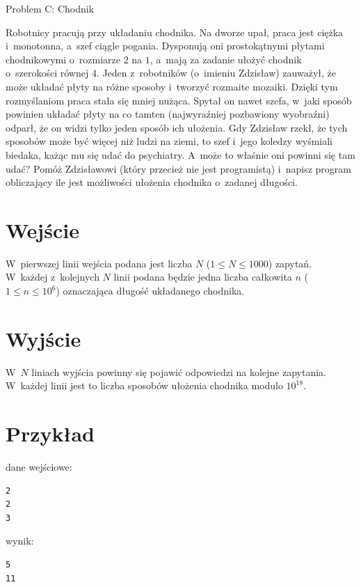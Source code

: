 \documentclass{article}
\begin{document}
\begin{center}
  \begin{Huge}
    Problem C: Chodnik
  \end{Huge}
\end{center}

Robotnicy pracują przy układaniu chodnika. Na dworze upał, praca jest ciężka i~monotonna, a~szef
ciągle pogania. Dysponują oni prostokątnymi płytami chodnikowymi o~rozmiarze $2$ na $1$, a~mają za
zadanie ułożyć chodnik o~szerokości równej $4$. Jeden z~robotników (o~imieniu Zdzisław) zauważył,
że może układać płyty na różne sposoby i~tworzyć rozmaite mozaiki. Dzięki tym rozmyślaniom
praca stała się mniej nużąca. Spytał on nawet szefa, w~jaki sposób powinien układać płyty na co
tamten (najwyraźniej pozbawiony wyobraźni) odparł, że on widzi tylko jeden sposób ich ułożenia.
Gdy Zdzisław rzekł, że tych sposobów może być więcej niż ludzi na ziemi, to szef i~jego koledzy
wyśmiali biedaka, każąc mu się udać do psychiatry. A~może to właśnie oni powinni się tam udać?
Pomóż Zdzisławowi (który przecież nie jest programistą) i~napisz program obliczający ile jest
możliwości ułożenia chodnika o~zadanej długości.

\section*{Wejście}
W~pierwszej linii wejścia podana jest liczba $N$ ($1\leqslant N\leqslant 1000$) zapytań. W~każdej z~kolejnych $N$ linii
podana będzie jedna liczba całkowita $n$ ($1\leqslant n \leqslant 10^6$) oznaczająca długość układanego chodnika.

\section*{Wyjście}
W~$N$ liniach wyjścia powinny się pojawić odpowiedzi na kolejne zapytania. W~każdej linii jest to
liczba sposobów ułożenia chodnika modulo $10^{18}$.

\section*{Przykład}
dane wejściowe:
\begin{verbatim}
2
2
3
\end{verbatim}
wynik:
\begin{verbatim}
5
11
\end{verbatim}
\end{document}
